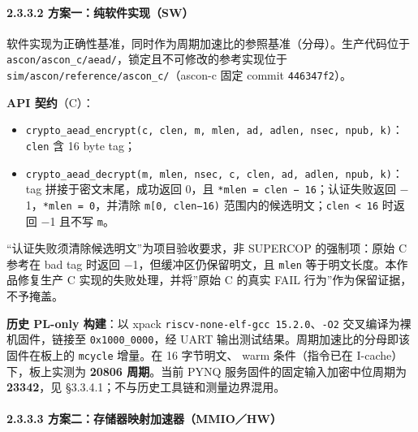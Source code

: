 \Needspace{85pt}

\paragraph{2.3.3.2 方案一：纯软件实现（SW）}\label{ux65b9ux6848ux4e00ux7eafux8f6fux4ef6ux5b9eux73b0sw}

软件实现为正确性基准，同时作为周期加速比的参照基准（分母）。生产代码位于 \texttt{ascon/\allowbreak{}ascon\_\allowbreak{}c/\allowbreak{}aead/\allowbreak{}}，锁定且不可修改的参考实现位于 \texttt{sim/\allowbreak{}ascon/\allowbreak{}reference/\allowbreak{}ascon\_\allowbreak{}c/\allowbreak{}}（ascon-c 固定 commit \texttt{446347f2}）。

\textbf{API 契约}（C）：

\begin{itemize}
\tightlist
\item
  \texttt{crypto\_\allowbreak{}aead\_\allowbreak{}encrypt(c,\ clen,\ m,\ mlen,\ ad,\ adlen,\ nsec,\ npub,\ k)}：\texttt{clen} 含 16 byte tag；
\item
  \texttt{crypto\_\allowbreak{}aead\_\allowbreak{}decrypt(m,\ mlen,\ nsec,\ c,\ clen,\ ad,\ adlen,\ npub,\ k)}：tag 拼接于密文末尾，成功返回 0，且 \texttt{*mlen\ =\ clen\ −\ 16}；认证失败返回 $-$1，\texttt{*mlen\ =\ 0}，并清除 \texttt{m{[}0,\ clen−16)} 范围内的候选明文；\texttt{clen\ \textless{}\ 16} 时返回 $-$1 且不写 \texttt{m}。
\end{itemize}

``认证失败须清除候选明文''为项目验收要求，非 SUPERCOP 的强制项：原始 C 参考在 bad tag 时返回 $-$1，但缓冲区仍保留明文，且 \texttt{mlen} 等于明文长度。本作品修复生产 C 实现的失败处理，并将''原始 C 的真实 FAIL 行为''作为保留证据，不予掩盖。

\textbf{历史 PL-only 构建}：以 xpack \texttt{riscv-\allowbreak{}none-\allowbreak{}elf-\allowbreak{}gcc\ 15.\allowbreak{}2.\allowbreak{}0}、\texttt{-\allowbreak{}O2} 交叉编译为裸机固件，链接至 \texttt{0x1000\_\allowbreak{}0000}，经 UART 输出测试结果。周期加速比的分母即该固件在板上的 \texttt{mcycle} 增量。在 16 字节明文、 warm 条件（指令已在 I-cache）下，板上实测为 \textbf{20806 周期}。当前 PYNQ 服务固件的固定输入加密中位周期为 \textbf{23342}，见 §3.3.4.1；不与历史工具链和测量边界混用。

\Needspace{85pt}

\paragraph{2.3.3.3 方案二：存储器映射加速器（MMIO／HW）}\label{ux65b9ux6848ux4e8cux5b58ux50a8ux5668ux6620ux5c04ux52a0ux901fux5668mmiohw}

